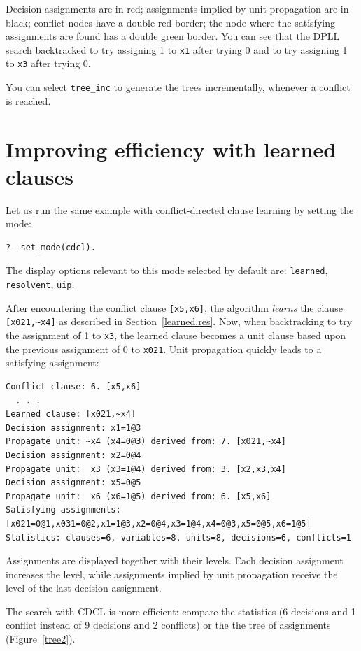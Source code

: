 \documentclass[11pt]{article}
\newcommand*{\p}[1]{\textup{\texttt{#1}}}
\begin{document}
Decision assignments are in red; assignments implied by unit propagation
are in black; conflict nodes have a double red border; the node where
the satisfying assignments are found has a double green border.
You can see that the DPLL search backtracked to try assigning 1 to
\p{x1} after trying 0 and to try assigning 1 to \p{x3} after trying 0.

You can select \p{tree\_inc} to generate the trees incrementally,
whenever a conflict is reached.


\section{Improving efficiency with learned clauses}

Let us run the same example with conflict-directed clause learning by setting the mode:

\begin{verbatim}
?- set_mode(cdcl).
\end{verbatim}

The display options relevant to this mode selected by default are:
\p{learned}, \p{resolvent}, \p{uip}.

After encountering the conflict clause \verb+[x5,x6]+, the algorithm
\emph{learns} the clause \verb+[x021,~x4]+ as described in
Section~\ref{learned.res}. Now, when backtracking to try the assignment
of 1 to \p{x3}, the learned clause becomes a unit clause based upon the
previous assignment of 0 to \p{x021}. Unit propagation quickly leads to
a satisfying assignment:

\begin{verbatim}
Conflict clause: 6. [x5,x6]
  . . .
Learned clause: [x021,~x4]
Decision assignment: x1=1@3
Propagate unit: ~x4 (x4=0@3) derived from: 7. [x021,~x4]
Decision assignment: x2=0@4
Propagate unit:  x3 (x3=1@4) derived from: 3. [x2,x3,x4]
Decision assignment: x5=0@5
Propagate unit:  x6 (x6=1@5) derived from: 6. [x5,x6]
Satisfying assignments:
[x021=0@1,x031=0@2,x1=1@3,x2=0@4,x3=1@4,x4=0@3,x5=0@5,x6=1@5]
Statistics: clauses=6, variables=8, units=8, decisions=6, conflicts=1
\end{verbatim}
Assignments are displayed together with their levels. Each decision
assignment increases the level, while assignments implied by unit
propagation receive the level of the last decision assignment. 

The search with CDCL is more efficient: compare the statistics (6
decisions and 1 conflict instead of 9 decisions and 2 conflicts) or the
the tree of assignments (Figure~\ref{tree2}).
\end{document}
